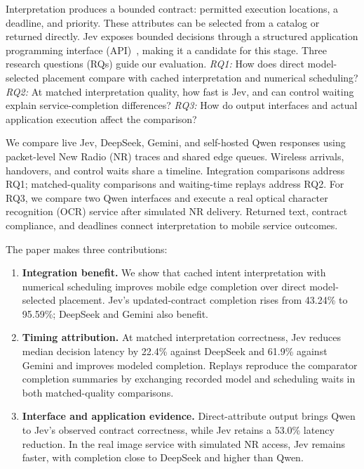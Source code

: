 Interpretation produces a bounded contract: permitted execution locations, a deadline, and priority. These attributes can be selected from a catalog or returned directly. Jev exposes bounded decisions through a structured application programming interface (API)~\cite{typesafe2026systemone}, making it a candidate for this stage. Three research questions (RQs) guide our evaluation. \emph{RQ1:} How does direct model-selected placement compare with cached interpretation and numerical scheduling? \emph{RQ2:} At matched interpretation quality, how fast is Jev, and can control waiting explain service-completion differences? \emph{RQ3:} How do output interfaces and actual application execution affect the comparison?

We compare live Jev, DeepSeek, Gemini, and self-hosted Qwen responses using packet-level New Radio (NR) traces and shared edge queues. Wireless arrivals, handovers, and control waits share a timeline. Integration comparisons address RQ1; matched-quality comparisons and waiting-time replays address RQ2. For RQ3, we compare two Qwen interfaces and execute a real optical character recognition (OCR) service after simulated NR delivery. Returned text, contract compliance, and deadlines connect interpretation to mobile service outcomes.

\begin{samepage}
The paper makes three contributions:
\begin{enumerate}
\item \textbf{Integration benefit.} We show that cached intent interpretation with numerical scheduling improves mobile edge completion over direct model-selected placement. Jev's updated-contract completion rises from 43.24\% to 95.59\%; DeepSeek and Gemini also benefit.
\item \textbf{Timing attribution.} At matched interpretation correctness, Jev reduces median decision latency by 22.4\% against DeepSeek and 61.9\% against Gemini and improves modeled completion. Replays reproduce the comparator completion summaries by exchanging recorded model and scheduling waits in both matched-quality comparisons.
\item \textbf{Interface and application evidence.} Direct-attribute output brings Qwen to Jev's observed contract correctness, while Jev retains a 53.0\% latency reduction. In the real image service with simulated NR access, Jev remains faster, with completion close to DeepSeek and higher than Qwen.
\end{enumerate}
\end{samepage}
